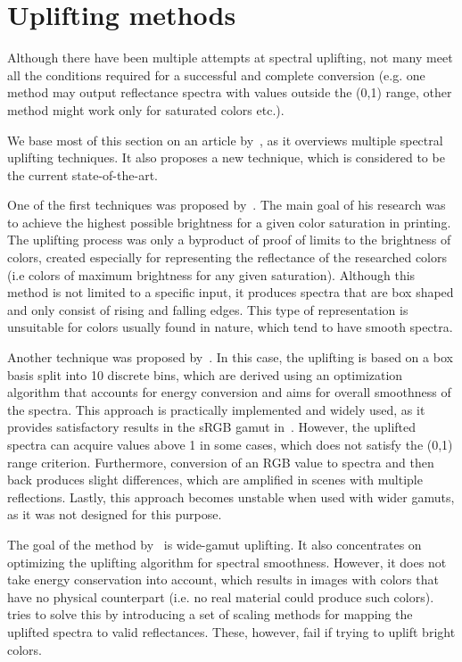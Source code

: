 \section{Uplifting methods}

Although there have been multiple attempts at spectral uplifting, not many meet all the conditions required for a successful and complete conversion (e.g. one method may output reflectance spectra with values outside the (0,1) range, other method might work only for saturated colors etc.).

We base most of this section on an article by~\citet{upsamplingTechniques}, as it overviews multiple spectral uplifting techniques. It also proposes a new technique, which is considered to be the current state-of-the-art.

One of the first techniques was proposed by~\citet{upsamplingMacAdam}. The main goal of his research was to achieve the highest possible brightness for a given color saturation in printing. The uplifting process was only a byproduct of proof of limits to the brightness of colors, created especially for representing the reflectance of the researched colors (i.e colors of maximum brightness for any given saturation). Although this method is not limited to a specific input, it produces spectra that are box shaped and only consist of rising and falling edges. This type of representation is unsuitable for colors usually found in nature, which tend to have smooth spectra.

Another technique was proposed by~\citet{upsamplingSmits}. In this case, the uplifting is based on a box basis split into 10 discrete bins, which are derived using an optimization algorithm that accounts for energy conversion and aims for overall smoothness of the spectra. This approach is practically implemented and widely used, as it provides satisfactory results in the sRGB gamut in~\cite{upsamplingJakobHanika}. However, the uplifted spectra can acquire values above 1 in some cases, which does not satisfy the (0,1) range criterion. Furthermore, conversion of an RGB value to spectra and then back produces slight differences, which are amplified in scenes with multiple reflections. Lastly, this approach becomes unstable when used with wider gamuts, as it was not designed for this purpose.

The goal of the method by~\citet{upsamplingMeng} is wide-gamut uplifting. It also concentrates on optimizing the uplifting algorithm for spectral smoothness. However, it does not take energy conservation into account, which results in images with colors that have no physical counterpart (i.e. no real material could produce such colors). \citet{upsamplingMeng} tries to solve this by introducing a set of scaling methods for mapping the uplifted spectra to valid reflectances. These, however, fail if trying to uplift bright colors. 

